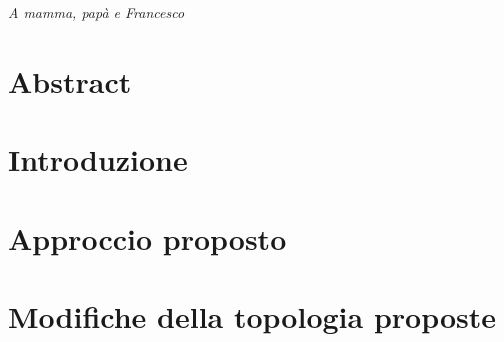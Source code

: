 \documentclass[a4paper, 12pt]{book}
\numberwithin{equation}{section}
\numberwithin{figure}{section}
\numberwithin{table}{section}
\begin{document}
	\thispagestyle{empty} %
	\cleardoublepage

	\clearpage{\pagestyle{plain}\cleardoublepage}
	\vspace*{\fill}
	\begin{flushright}
		\textit{A mamma, papà e Francesco}
	\end{flushright}
	\vspace*{\fill}

	\thispagestyle{empty}
	\clearpage{\pagestyle{plain}\cleardoublepage}
	\tableofcontents %
	
	\clearpage{\pagestyle{plain}\cleardoublepage} %
	
	\clearpage{\pagestyle{plain}\cleardoublepage}
	\chapter*{Abstract} %
	
	\clearpage{\pagestyle{plain}\cleardoublepage} %
	\chapter{Introduzione} %
	\label{chapter:primo} %
	
	\clearpage{\pagestyle{plain}\cleardoublepage} %
	\chapter{Approccio proposto} %
	\label{chapter:secondo} %

	\clearpage{\pagestyle{plain}\cleardoublepage} %
	\chapter{Modifiche della topologia proposte} %
	\label{chapter:terzo} %
\end{document}
